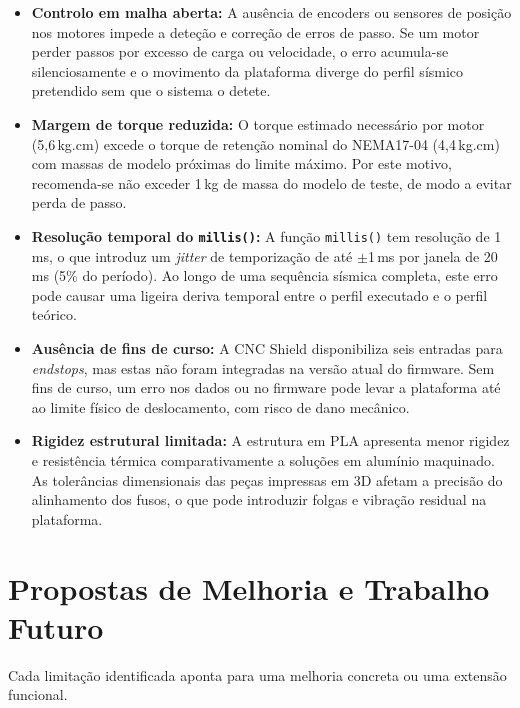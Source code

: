 \begin{itemize}
    \item \textbf{Controlo em malha aberta:} A ausência de encoders ou sensores de posição nos motores impede a deteção e correção de erros de passo. Se um motor perder passos por excesso de carga ou velocidade, o erro acumula-se silenciosamente e o movimento da plataforma diverge do perfil sísmico pretendido sem que o sistema o detete.

    \item \textbf{Margem de torque reduzida:} O torque estimado necessário por motor (5,6\,kg.cm) excede o torque de retenção nominal do NEMA17-04 (4,4\,kg.cm) com massas de modelo próximas do limite máximo. Por este motivo, recomenda-se não exceder 1\,kg de massa do modelo de teste, de modo a evitar perda de passo.

    \item \textbf{Resolução temporal do \texttt{millis()}:} A função \texttt{millis()} tem resolução de 1\,ms, o que introduz um \textit{jitter} de temporização de até $\pm$1\,ms por janela de 20\,ms (5\% do período). Ao longo de uma sequência sísmica completa, este erro pode causar uma ligeira deriva temporal entre o perfil executado e o perfil teórico.

    \item \textbf{Ausência de fins de curso:} A CNC Shield disponibiliza seis entradas para \textit{endstops}, mas estas não foram integradas na versão atual do firmware. Sem fins de curso, um erro nos dados ou no firmware pode levar a plataforma até ao limite físico de deslocamento, com risco de dano mecânico.

    \item \textbf{Rigidez estrutural limitada:} A estrutura em PLA apresenta menor rigidez e resistência térmica comparativamente a soluções em alumínio maquinado. As tolerâncias dimensionais das peças impressas em 3D afetam a precisão do alinhamento dos fusos, o que pode introduzir folgas e vibração residual na plataforma.
\end{itemize}


\section{Propostas de Melhoria e Trabalho Futuro}
\label{sec:trabalho-futuro}

Cada limitação identificada aponta para uma melhoria concreta ou uma extensão funcional.

